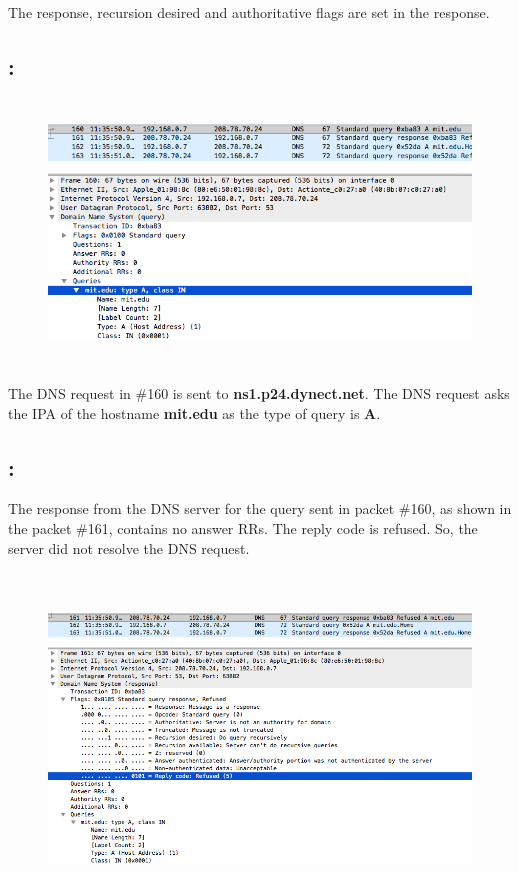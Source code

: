 \documentclass[]{report}
\begin{document}
The response, recursion desired and authoritative flags are set in the response. 

\subsection{:}

\begin{figure}[H]
	\vspace{0pt}
	\includegraphics[height = 200pt, keepaspectratio]{Snapshots/q2/2_3.png}
\end{figure}

The DNS request in \#160 is sent to \textbf{ns1.p24.dynect.net}. The DNS request asks the IPA of the hostname \textbf{mit.edu} as the type of query is \textbf{A}.

\subsection{:}

The response from the DNS server for the query sent in packet \#160, as shown in the packet \#161, contains no answer RRs. The reply code is refused. So, the server did not resolve the DNS request. 

\begin{figure}[H]
	\vspace{0pt}
	\includegraphics[height = 250pt, keepaspectratio]{Snapshots/q2/2_4.png}
\end{figure}

\end{document}
